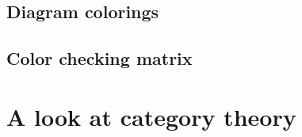 \documentclass[14pt]{extarticle} %
\begin{document}
\subsection{Diagram colorings}



\subsection{Color checking matrix}



% 


%


\section{A look at category theory}

% 
%
% 
%
% 




\newpage 



%
%
%
\end{document}
